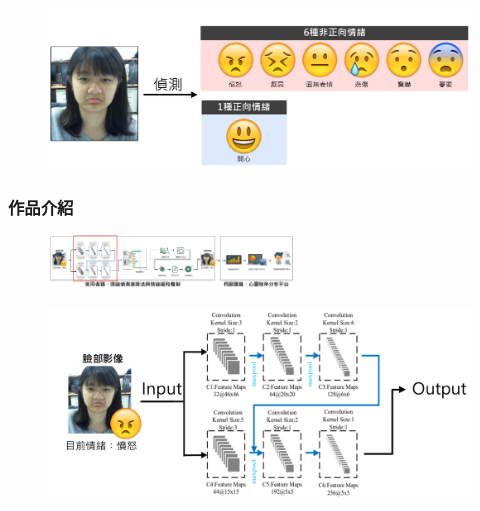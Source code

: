 \documentclass[10pt, conference, compsocconf]{beamer}
\begin{document}
\begin{CJK}{UTF8}{}
\begin{frame}
\vspace{-10mm}
\begin{figure}[!t]
\begin{center}
\includegraphics[width=12.3cm]{./Figures/Detect7Emotion2.pdf}
\end{center}
\end{figure}

\end{frame}

\begin{frame}
\frametitle{作品介紹}
\begin{figure}[t]
\begin{flushright}
\vspace{-3mm}
\includegraphics[width=6.5cm]{./Figures/framework_version4_2.pdf}
\end{flushright}
\end{figure}

\vspace{-9mm}
\begin{figure}[!t]
\begin{center}
\includegraphics[width=12.3cm]{./Figures/FrameworkFirst.pdf}
\end{center}
\end{figure}


\end{frame}
\end{CJK}
\end{document}
